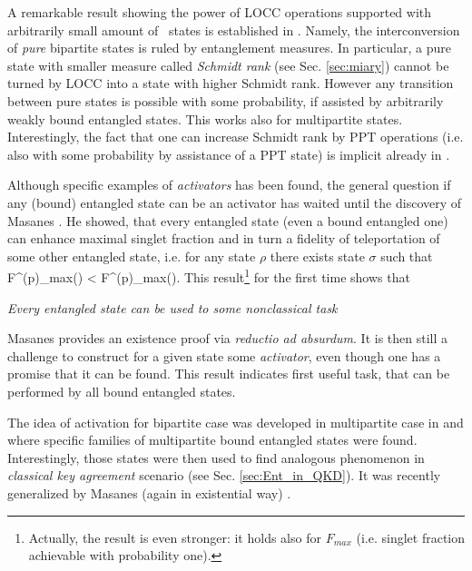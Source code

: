 \documentclass[twocolumn,aps,rmp]{revtex4}
\begin{document}
A remarkable result showing the power of LOCC operations supported
with arbitrarily small amount of \bent\ states is established in
\cite{Ishizaka04}. Namely, the interconversion of {\it pure} bipartite
states is ruled by entanglement measures. In particular, a pure state
with smaller measure called {\it Schmidt rank} (see Sec.
\ref{sec:miary}) cannot be turned by LOCC into a state with higher
Schmidt rank. However any transition between pure states is possible
with some probability, if assisted by arbitrarily weakly bound
entangled states. This works also for multipartite
states. Interestingly, the fact that one can increase Schmidt rank by
PPT operations (i.e. also with some probability by assistance of a PPT
state) is implicit already in \cite{AudenaertPE2002-PPT}.


Although specific examples of {\it activators} has been found, the
general question if any (bound) entangled state can be an activator
has waited until the discovery of Masanes
\cite{Masanes1_activation,Masanes-multiactiv}. He showed,
that every entangled state (even a bound entangled one) can enhance
maximal singlet fraction and in turn a fidelity of teleportation of some other entangled state, i.e. for any state $\rho$ there exists
state $\sigma$ such that
\be
F^{(p)}_{max}(\sigma) < F^{(p)}_{max}(\rho\ot\sigma).
\ee
This result\footnote{Actually, the result is even stronger: it holds also for $F_{max}$ (i.e. singlet fraction achievable with probability one).} for the first time shows that

\bei
\item {\it Every entangled state can be used to some nonclassical task}
\eei

Masanes provides an existence proof via {\it reductio ad absurdum}. It
is then still a challenge to construct for a given state some {\it
  activator}, even though one has a promise that it can be found. This
result indicates first useful task, that can be performed by all bound
entangled states.


The idea of activation for bipartite case was developed in
multipartite case in \cite{DurCirac_activation} and
\cite{Bandyo_multi_activation} where specific families of
multipartite bound entangled states were found. Interestingly, those
states were then used to find analogous phenomenon in {\it classical
key agreement} scenario (see Sec. \ref{sec:Ent_in_QKD}). It was
recently generalized by Masanes (again in existential way)
\cite{Masanes-multiactiv}.
\end{document}
